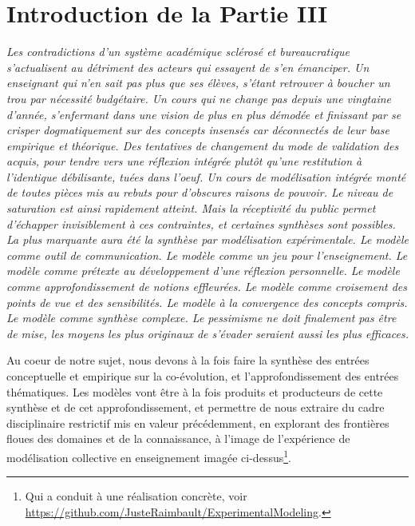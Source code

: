 



\chapter*{Introduction de la Partie III}






\textit{Les contradictions d'un système académique sclérosé et bureaucratique s'actualisent au détriment des acteurs qui essayent de s'en émanciper. Un enseignant qui n'en sait pas plus que ses élèves, s'étant retrouver à boucher un trou par nécessité budgétaire. Un cours qui ne change pas depuis une vingtaine d'année, s'enfermant dans une vision de plus en plus démodée et finissant par se crisper dogmatiquement sur des concepts insensés car déconnectés de leur base empirique et théorique. Des tentatives de changement du mode de validation des acquis, pour tendre vers une réflexion intégrée plutôt qu'une restitution à l'identique débilisante, tuées dans l'oeuf. Un cours de modélisation intégrée monté de toutes pièces mis au rebuts pour d'obscures raisons de pouvoir. Le niveau de saturation est ainsi rapidement atteint. Mais la réceptivité du public permet d'échapper invisiblement à ces contraintes, et certaines synthèses sont possibles. La plus marquante aura été la synthèse par modélisation expérimentale. Le modèle comme outil de communication. Le modèle comme un jeu pour l'enseignement. Le modèle comme prétexte au développement d'une réflexion personnelle. Le modèle comme approfondissement de notions effleurées. Le modèle comme croisement des points de vue et des sensibilités. Le modèle à la convergence des concepts compris. Le modèle comme synthèse complexe. Le pessimisme ne doit finalement pas être de mise, les moyens les plus originaux de s'évader seraient aussi les plus efficaces.}


\bigskip


Au coeur de notre sujet, nous devons à la fois faire la synthèse des entrées conceptuelle et empirique sur la co-évolution, et l'approfondissement des entrées thématiques. Les modèles vont être à la fois produits et producteurs de cette synthèse et de cet approfondissement, et permettre de nous extraire du cadre disciplinaire restrictif mis en valeur précédemment, en explorant des frontières floues des domaines et de la connaissance, à l'image de l'expérience de modélisation collective en enseignement imagée ci-dessus\footnote{Qui a conduit à une réalisation concrète, voir \url{https://github.com/JusteRaimbault/ExperimentalModeling}.}.


